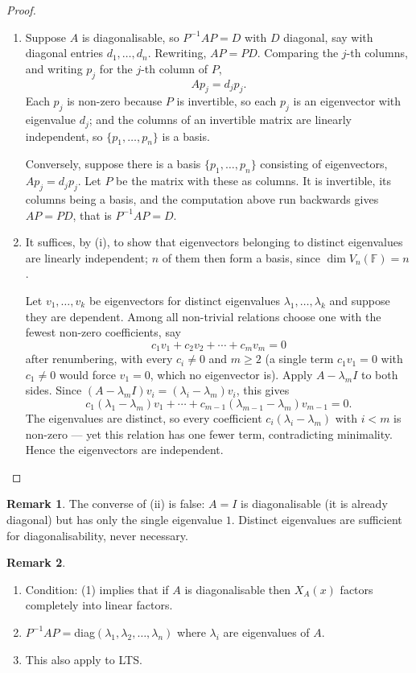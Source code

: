 \documentclass[11pt,a4paper]{article}
\theoremstyle{definition}
\newtheorem*{remark}{Remark}
\begin{document}
\begin{proof}
\begin{enumerate}
\item[i.] Suppose $A$ is diagonalisable, so $P^{-1}AP=D$ with $D$ diagonal,
say with diagonal entries $d_1,\dots,d_n$. Rewriting, $AP=PD$. Comparing the
$j$-th columns, and writing $p_j$ for the $j$-th column of $P$,
$$Ap_j=d_jp_j.$$
Each $p_j$ is non-zero because $P$ is invertible, so each $p_j$ is an
eigenvector with eigenvalue $d_j$; and the columns of an invertible matrix are
linearly independent, so $\{p_1,\dots,p_n\}$ is a basis.

Conversely, suppose there is a basis $\{p_1,\dots,p_n\}$ consisting of
eigenvectors, $Ap_j=d_jp_j$. Let $P$ be the matrix with these as columns. It is
invertible, its columns being a basis, and the computation above run backwards
gives $AP=PD$, that is $P^{-1}AP=D$.

\item[ii.] It suffices, by (i), to show that eigenvectors belonging to distinct
eigenvalues are linearly independent; $n$ of them then form a basis, since
$\dim V_n(\mathbb{F})=n$.

Let $v_1,\dots,v_k$ be eigenvectors for distinct eigenvalues
$\lambda_1,\dots,\lambda_k$ and suppose they are dependent. Among all
non-trivial relations choose one with the fewest non-zero coefficients, say
$$c_1v_1+c_2v_2+\cdots+c_mv_m=0$$
after renumbering, with every $c_i\neq 0$ and $m\geq 2$ (a single term
$c_1v_1=0$ with $c_1\neq 0$ would force $v_1=0$, which no eigenvector is).
Apply $A-\lambda_mI$ to both sides. Since $(A-\lambda_mI)v_i
=(\lambda_i-\lambda_m)v_i$, this gives
$$c_1(\lambda_1-\lambda_m)v_1+\cdots+c_{m-1}(\lambda_{m-1}-\lambda_m)v_{m-1}=0.$$
The eigenvalues are distinct, so every coefficient $c_i(\lambda_i-\lambda_m)$
with $i<m$ is non-zero --- yet this relation has one fewer term, contradicting
minimality. Hence the eigenvectors are independent.
\end{enumerate}
\end{proof}

\begin{remark}
The converse of (ii) is false: $A=I$ is diagonalisable (it is already diagonal)
but has only the single eigenvalue $1$. Distinct eigenvalues are sufficient for
diagonalisability, never necessary.
\end{remark}


\begin{remark}
\begin{enumerate}
\item Condition: (1) implies that if $A$ is diagonalisable then $X_A(x)$ factors completely into linear factors.
\item $P^{-1}AP= $diag$(\lambda_1,\lambda_2,\dots,\lambda_n)$ where $\lambda_i$ are eigenvalues of $A$.
\item This also apply to LTS.
\end{enumerate}
\end{remark}
\end{document}
